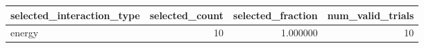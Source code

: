 \begin{tabular}{lrrr}
\toprule
selected_interaction_type & selected_count & selected_fraction & num_valid_trials \\
\midrule
energy & 10 & 1.000000 & 10 \\
\bottomrule
\end{tabular}
